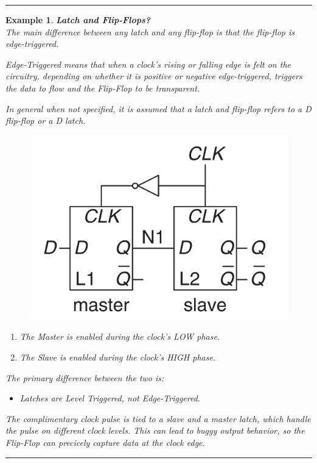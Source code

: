 \documentclass[12pt]{article}
\newtheorem{example}{Example}
\newenvironment{examp}
{
	\vspace{.5cm}
	\hrule
\begin{example}\upshape}
	{\hrule
		\vspace{0.5cm}
\end{example}}
\begin{document}
\begin{examp}
	\textbf{Latch and Flip-Flops?}\\
	The main difference between any latch and any
	flip-flop is that the flip-flop is \textit{edge-triggered}.
	
	Edge-Triggered means that when a clock's rising or falling edge is felt on the circuitry, depending on whether it is positive or negative edge-triggered, triggers the data to flow and the Flip-Flop to be transparent.
	
	In general when
	not specified, it is assumed that a \textit{latch} and \textit{flip-flop}
	refers to a D flip-flop or a D latch.
	\begin{figure}[H]
		\centering
		\includegraphics[scale=.3]{examp082.png}
	\end{figure}
	\begin{enumerate}
		\item The Master is enabled during the clock's LOW phase.
		\item The Slave is enabled during the clock's HIGH phase.
	\end{enumerate}
	The primary difference between the two is:
	
	\begin{itemize}
		\item Latches are Level Triggered, not Edge-Triggered.
	\end{itemize}
	
	The complimentary clock pulse
	is tied to a slave and a master latch, which handle the pulse on different
	clock \textit{levels}. This can lead to buggy output behavior, so the
	Flip-Flop can precicely capture data at the clock edge.
	
	
\end{examp}
\end{document}
